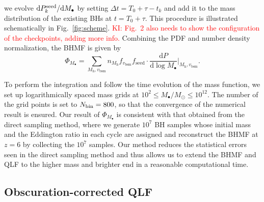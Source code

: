 \documentclass[twocolumn, twocolappendix]{aastex63}
\newcommand{\Msun}{M_\odot}
\newcommand{\Mh}{M_\mathrm{h}}
\newcommand{\Mbh}{M_\bullet}
\newcommand{\vbsm}{v_\mathrm{bsm}}
\newcommand{\tlife}{\tau}
\newcommand{\fseed}{f_\mathrm{seed}}
\newcommand{\D}{\mathrm{d}}
\newcommand{\red}[1]{\textcolor{red}{ #1}}
\begin{document}
\begin{CJK*}{UTF8}{gbsn}
we evolve $\D P^{\rm seed}_k/\D \Mbh$ by setting $\Delta t = T_0+\tlife -t_k$ and add it to the mass distribution 
of the existing BHs at $t=T_0+\tlife$.
This procedure is illustrated schematically in Fig.~\ref{fig:scheme}. 
\red{KI: Fig.~2 also needs to show the configuration of the checkpoints, adding more info.}
Combining the PDF and number density normalization, the BHMF is given by
%
\begin{equation}
  \Phi_{\Mbh} 
  =\sum_{\Mh, \vbsm} n_{\Mh} f_{\vbsm} {\fseed} \cdot \frac{\D P}{\D \log \Mbh}\Big|_{\Mh, \vbsm}.
 \end{equation}


To perform the integration and follow the time evolution of the mass function, we set up 
logarithmically spaced mass grids at $10^2 \leq \Mbh /\Msun \leq 10^{12}$.
The number of the grid points is set to $N_{\rm bin}=800$, so that the convergence of the numerical result is ensured.
%
Our result of $\Phi_{\Mbh}$ is consistent with that obtained from the direct sampling method, where 
we generate $10^7$ BH samples whose initial mass and the Eddington ratio in each cycle are assigned
and reconstruct the BHMF at $z=6$ by collecting the $10^7$ samples.
Our method reduces the statistical errors seen in the direct sampling method 
and thus allows us to extend the BHMF and QLF to the higher mass and brighter end
in a reasonable computational time.







\vspace{2mm}
\subsection{Obscuration-corrected QLF}\label{sec:LF}


\end{CJK*}
\end{document}
